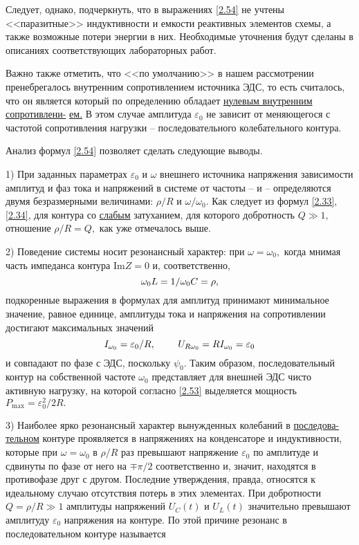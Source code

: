 Следует, однако, подчеркнуть, что в выражениях \eqref{2.54} не учтены <<паразитные>> индуктивности и емкости реактивных элементов схемы, а также возможные потери энергии в них. Необходимые уточнения будут сделаны в описаниях соответствующих лабораторных работ.

Важно также отметить, что <<по умолчанию>> в нашем рассмотрении пренебрегалось внутренним сопротивлением источника ЭДС, то есть считалось, что он является  который по определению обладает \underline{нулевым внутренним сопротивлени-} \underline{ем.} В этом случае амплитуда $\varepsilon_0$ не зависит от меняющегося с частотой сопротивления нагрузки – последовательного колебательного контура.

Анализ формул \eqref{2.54} позволяет сделать следующие выводы.

1) При заданных параметрах $\varepsilon_0$ и $\omega$ внешнего источника напряжения зависимости амплитуд и фаз тока и напряжений в системе от частоты –  и  – определяются двумя безразмерными величинами: $\rho/R$ и $\omega/\omega_0.$ Как следует из формул \eqref{2.33}, \eqref{2.34}, для контура со \underline{слабым} затуханием, для которого добротность $Q\gg1,$ отношение $\rho/R=Q,$ как уже отмечалось выше.

2) Поведение системы носит резонансный характер: при $\omega=\omega_0,$ когда мнимая часть импеданса контура $\text{Im}Z=0$ и, соответственно,
\begin{equation}\eqmark{2.55}
	\omega_0L=1/\omega_0C=\rho,
\end{equation}
подкоренные выражения в формулах для амплитуд принимают минимальное значение, равное единице, амплитуды тока и напряжения на сопротивлении достигают максимальных значений
\begin{equation}\eqmark{2.56}
	I_{\omega_0}=\varepsilon_0/R,~~~~~~~U_{R\omega_0}=RI_{\omega_0}=\varepsilon_0
\end{equation}
и совпадают по фазе с ЭДС, поскольку $\psi_0.$ Таким образом, последовательный контур на собственной частоте $\omega_0$ представляет для внешней ЭДС чисто активную нагрузку, на которой согласно \eqref{2.53} выделяется мощность $P_{\text{max}}=\varepsilon_0^2/2R.$

3) Наиболее ярко резонансный характер вынужденных колебаний в \underline{последова-} \underline{тельном} контуре проявляется в напряжениях на конденсаторе и индуктивности, которые при $\omega=\omega_0$ в $\rho/R$ раз превышают напряжение $\varepsilon_0$ по амплитуде и сдвинуты по фазе от него на $\mp\pi/2$ соответственно и, значит, находятся в противофазе друг с другом. Последние утверждения, правда, относятся к идеальному случаю отсутствия потерь в этих элементах. При добротности $Q=\rho/R\gg1$ амплитуды напряжений $U_C(t)$ и $U_L(t)$ значительно превышают амплитуду $\varepsilon_0$ напряжения на контуре. По этой причине резонанс в последовательном контуре называется 

